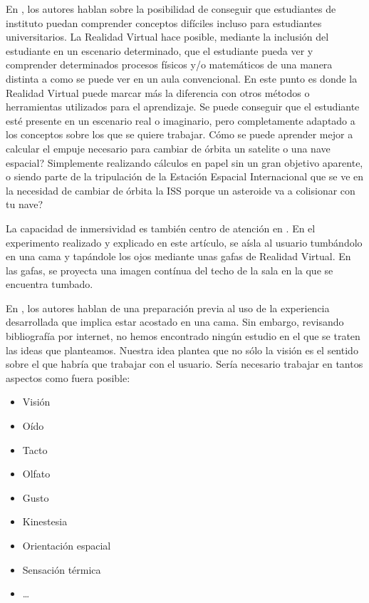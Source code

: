 \documentclass[twoside,twocolumn]{article}
\begin{document}
En \cite{ScienceSpace}, los autores hablan sobre la posibilidad de conseguir que estudiantes de instituto puedan comprender conceptos dif\'iciles incluso para estudiantes universitarios. La Realidad Virtual hace posible, mediante la inclusi\'on del estudiante en un escenario determinado, que el estudiante pueda ver y comprender determinados procesos f\'isicos y/o matem\'aticos de una manera distinta a como se puede ver en un aula convencional. En este punto es donde la Realidad Virtual puede marcar m\'as la diferencia con otros m\'etodos o herramientas utilizados para el aprendizaje. Se puede conseguir que el estudiante est\'e presente en un escenario real o imaginario, pero completamente adaptado a los conceptos sobre los que se quiere trabajar. C\'omo se puede aprender mejor a calcular el empuje necesario para cambiar de \'orbita un satelite o una nave espacial? Simplemente realizando c\'alculos en papel sin un gran objetivo aparente, o siendo parte de la tripulaci\'on de la Estaci\'on Espacial Internacional que se ve en la necesidad de cambiar de \'orbita la ISS porque un asteroide va a colisionar con tu nave?

La capacidad de inmersividad es tambi\'en centro de atenci\'on en \cite{Presence}. En el experimento realizado y explicado en este art\'i­culo, se a\'isla al usuario tumb\'andolo en una cama y tap\'andole los ojos mediante unas gafas de Realidad Virtual. En las gafas, se proyecta una imagen cont\'inua del techo de la sala en la que se encuentra tumbado.

En \cite{Presence}, los autores hablan de una preparaci\'on previa al uso de la experiencia desarrollada que implica estar acostado en una cama. Sin embargo, revisando bibliograf\'i­a por internet, no hemos encontrado ning\'un estudio en el que se traten las ideas que planteamos. Nuestra idea plantea que no s\'olo la visi\'on es el sentido sobre el que habr\'ia que trabajar con el usuario. Ser\'ia necesario trabajar en tantos aspectos como fuera posible:

\begin{itemize}
\item Visi\'on
\item O\'ido
\item Tacto
\item Olfato
\item Gusto
\item Kinestesia
\item Orientaci\'on espacial
\item Sensaci\'on t\'ermica
\item \ldots
\end{itemize}
\end{document}
